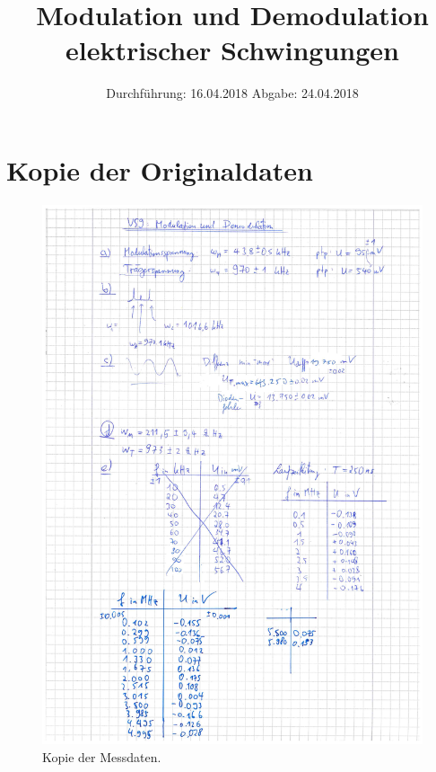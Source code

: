 

\subject{V 59}
\title{Modulation und Demodulation elektrischer Schwingungen}
\date{
  Durchführung: 16.04.2018
  \hspace{3em}
  Abgabe: 24.04.2018
}



\maketitle
\thispagestyle{empty}
\tableofcontents
\newpage






\printbibliography

\appendix
\section{Kopie der Originaldaten}

\begin{figure}[h]
  \centering
  \includegraphics[width=.9\textwidth]{Messwerte.pdf}
  \caption{Kopie der Messdaten.}
  \label{fig:hnachSchwingkreis}
\end{figure}


